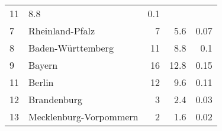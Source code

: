 \begin{longtable}{lXrrr}
       \num{11} &
       \num[round-mode=places,round-precision=2]{8.8} &
         \num[round-mode=places,round-precision=2]{0.1} \\

     7 &
     \multicolumn{1}{X}{ Rheinland-Pfalz   } &


       \num{7} &
       \num[round-mode=places,round-precision=2]{5.6} &
         \num[round-mode=places,round-precision=2]{0.07} \\

     8 &
     \multicolumn{1}{X}{ Baden-Württemberg   } &


       \num{11} &
       \num[round-mode=places,round-precision=2]{8.8} &
         \num[round-mode=places,round-precision=2]{0.1} \\

     9 &
     \multicolumn{1}{X}{ Bayern   } &


       \num{16} &
       \num[round-mode=places,round-precision=2]{12.8} &
         \num[round-mode=places,round-precision=2]{0.15} \\

     11 &
     \multicolumn{1}{X}{ Berlin   } &


       \num{12} &
       \num[round-mode=places,round-precision=2]{9.6} &
         \num[round-mode=places,round-precision=2]{0.11} \\

     12 &
     \multicolumn{1}{X}{ Brandenburg   } &


       \num{3} &
       \num[round-mode=places,round-precision=2]{2.4} &
         \num[round-mode=places,round-precision=2]{0.03} \\

     13 &
     \multicolumn{1}{X}{ Mecklenburg-Vorpommern   } &


       \num{2} &
       \num[round-mode=places,round-precision=2]{1.6} &
         \num[round-mode=places,round-precision=2]{0.02} \\


\end{longtable}

